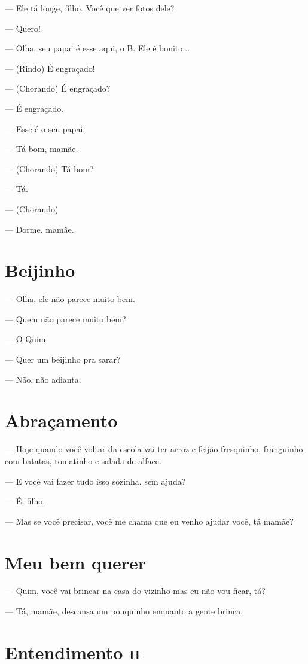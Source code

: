 {{--- Ele tá longe, filho. Você que ver fotos dele?

--- Quero!

--- Olha, seu papai é esse aqui, o B. Ele é bonito...

--- (Rindo) É engraçado!

--- (Chorando) É engraçado?

--- É engraçado.

--- Esse é o seu papai.

--- Tá bom, mamãe.

--- (Chorando) Tá bom?

--- Tá.

--- (Chorando)

--- Dorme, mamãe.

\chapter{Beijinho}\label{beijinho}

--- Olha, ele não parece muito bem.

--- Quem não parece muito bem?

--- O Quim.

--- Quer um beijinho pra sarar?

--- Não, não adianta.

\chapter{Abraçamento}\label{abrauxe7amento}

--- Hoje quando você voltar da escola vai ter arroz e feijão fresquinho,
franguinho com batatas, tomatinho e salada de alface.

--- E você vai fazer tudo isso sozinha, sem ajuda?

--- É, filho.

--- Mas se você precisar, você me chama que eu venho ajudar você, tá
mamãe?

\chapter{Meu bem querer}\label{meu-bem-querer}

--- Quim, você vai brincar na casa do vizinho mas eu não vou ficar, tá?

--- Tá, mamãe, descansa um pouquinho enquanto a gente brinca.

\chapter{Entendimento \textsc{ii}}

}}
